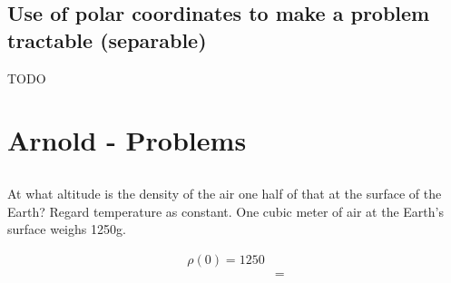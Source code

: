 \subsection{Use of polar coordinates to make a problem tractable (separable)}
TODO

\section{Arnold - Problems}
\subsection{}
\begin{mdframed}
  At what altitude is the density of the air one half of that at the surface of
  the Earth? Regard temperature as constant. One cubic meter of air at the
  Earth's surface weighs 1250g.
\end{mdframed}
\begin{align*}
  \rho(0) = 1250\\
  &=
\end{align*}
